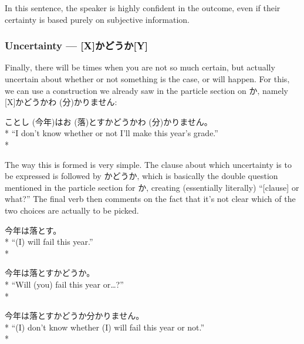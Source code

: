 \documentclass[11pt, b5paper, twoside, openright, onecolumn]{book}
\makeatletter
\newcommand*{\rubystack}[2]{{\relscale{0.5}%
  \begin{tabular}[b]{@{}c@{}}%
    {#1}\\%
   {\textscale{2}{#2}}%
  \end{tabular}}%
}
\DeclareRobustCommand*{\ruby}[2]{%
  \mbox{%
    \setlength{\parskip}{0ex}%
    \BeginAccSupp{method=pdfstringdef,ActualText={#1}}%
      \rubystack{\phantom{#2}}{#1}%
      \llap{%
        \rubystack{#2}{\phantom{#1}}%
      }%
    \EndAccSupp{}%
  }%
}
\renewcommand*{\ruby}[2]{#2 (#1)}%
\newenvironment{exampleblock}{
\setlength{\parindent}{0.6in}
\begin{minipage}[t]{\dimexpr\textwidth-\parindent}}
{\end{minipage}}
\makeatother
\begin{document}
In this sentence‚ the speaker is highly confident in the outcome‚ even if their certainty is based purely on subjective information.

\subsubsection{Uncertainty — [X]かどうか[Y]}

Finally‚ there will be times when you are not so much certain‚ but actually uncertain about whether or not something is the case‚ or will happen. For this‚ we can use a construction we already saw in the particle section on か‚ namely [X]かどうか\ruby{分}{わ}かりません:

\vspace{0.4cm}
\begin{exampleblock}
\ruby{今年}{ことし}は\ruby{落}{お}とすかどうか\ruby{分}{わ}かりません。 \\* 
“I don’t know whether or not I’ll make this year’s grade.” \\* 
\end{exampleblock}
\vspace{0.2cm}

The way this is formed is very simple. The clause about which uncertainty is to be expressed is followed by かどうか‚ which is basically the double question mentioned in the particle section for か‚ creating (essentially literally) “[clause] or what?” The final verb then comments on the fact that it’s not clear which of the two choices are actually to be picked.

\vspace{0.4cm}
\begin{exampleblock}
今年は落とす。 \\* 
“(I) will fail this year.” \\* 
\end{exampleblock}
\vspace{0.2cm}

\begin{exampleblock}
今年は落とすかどうか。 \\* 
“Will (you) fail this year or…?” \\* 
\end{exampleblock}
\vspace{0.2cm}

\begin{exampleblock}
今年は落とすかどうか分かりません。 \\* 
“(I) don’t know whether (I) will fail this year or not.” \\* 
\end{exampleblock}
\end{document}
